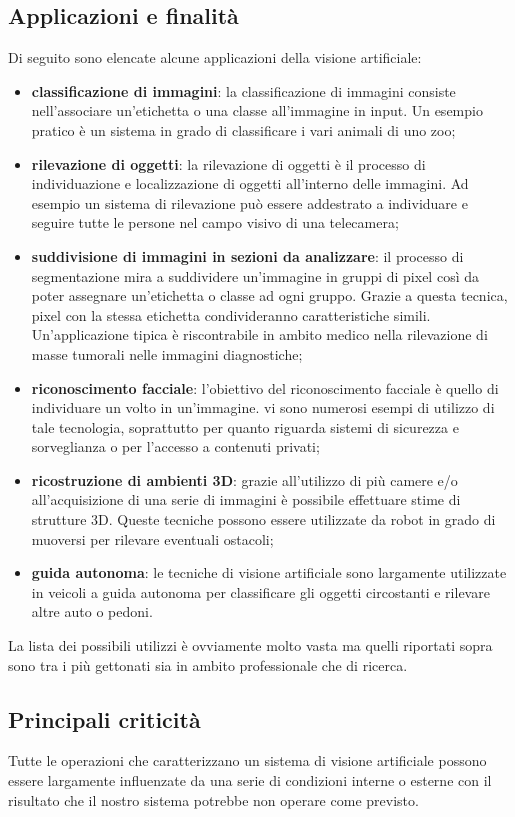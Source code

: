 \documentclass[12pt,a4paper,openright,twoside]{book}
\begin{document}
\subsection{Applicazioni e finalità}
Di seguito sono elencate alcune applicazioni della visione artificiale:
\begin{itemize}
	\item \textbf{classificazione di immagini}: la classificazione di immagini consiste nell'associare un'etichetta o una classe all'immagine in input. Un esempio pratico è un sistema in grado di classificare i vari animali di uno zoo;
	\item \textbf{rilevazione di oggetti}: la rilevazione di oggetti è il processo di individuazione e localizzazione di oggetti all'interno delle immagini. Ad esempio un sistema di rilevazione può essere addestrato a individuare e seguire tutte le persone nel campo visivo di una telecamera;
	\item \textbf{suddivisione di immagini in sezioni da analizzare}: il processo di segmentazione mira a suddividere un'immagine in gruppi di pixel così da poter assegnare un'etichetta o classe ad ogni gruppo. Grazie a questa tecnica, pixel con la stessa etichetta condivideranno caratteristiche simili. Un'applicazione tipica è riscontrabile in ambito medico nella rilevazione di masse tumorali nelle immagini diagnostiche;
	\item \textbf{riconoscimento facciale}: l'obiettivo del riconoscimento facciale è quello di individuare un volto in un'immagine. vi sono numerosi esempi di utilizzo di tale tecnologia, soprattutto per quanto riguarda sistemi di sicurezza e sorveglianza o per l'accesso a contenuti privati;
	\item \textbf{ricostruzione di ambienti 3D}: grazie all'utilizzo di più camere e/o all'acquisizione di una serie di immagini è possibile effettuare stime di strutture 3D. Queste tecniche possono essere utilizzate da robot in grado di muoversi per rilevare eventuali ostacoli;
	\item \textbf{guida autonoma}: le tecniche di visione artificiale sono largamente utilizzate in veicoli a guida autonoma per classificare gli oggetti circostanti e rilevare altre auto o pedoni.
\end{itemize}
La lista dei possibili utilizzi è ovviamente molto vasta ma quelli riportati sopra sono tra i più gettonati sia in ambito professionale che di ricerca.

\subsection{Principali criticità}
Tutte le operazioni che caratterizzano un sistema di visione artificiale possono essere largamente influenzate da una serie di condizioni interne o esterne con il risultato che il nostro sistema potrebbe non operare come previsto.
\end{document}
